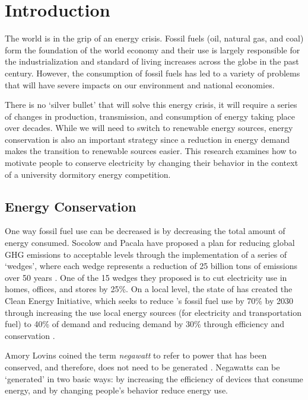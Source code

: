 \chapter{Introduction}

The world is in the grip of an energy crisis. Fossil fuels (oil, natural gas, and coal) form the foundation of the world economy and their use is largely responsible for the industrialization and standard of living increases across the globe in the past century. However, the consumption of fossil fuels has led to a variety of problems that will have severe impacts on our environment and national economies.

There is no `silver bullet' that will solve this energy crisis, it will require a series of changes in production, transmission, and consumption of energy taking place over decades. While we will need to switch to renewable energy sources, energy conservation is also an important strategy since a reduction in energy demand makes the transition to renewable sources easier. This research examines how to motivate people to conserve electricity by changing their behavior in the context of a university dormitory energy competition.

\section{Energy Conservation}

One way fossil fuel use can be decreased is by decreasing the total amount of energy consumed. Socolow and Pacala have proposed a plan for reducing global GHG emissions to acceptable levels through the implementation of a series of `wedges', where each wedge represents a reduction of 25 billion tons of \COtwo emissions over 50 years \cite{Socolow2008}. One of the 15 wedges they proposed is to cut electricity use in homes, offices, and stores by 25\%. On a local level, the state of \Hawaii has created the \Hawaii Clean Energy Initiative, which seeks to reduce \Hawaii's fossil fuel use by 70\% by 2030 through increasing the use local energy sources (for electricity and transportation fuel) to 40\% of demand and reducing demand by 30\% through efficiency and conservation \cite{HCEI-website}.

Amory Lovins coined the term \emph{negawatt} to refer to power that has been conserved, and therefore, does not need to be generated \cite{Kolbert2007Mr-Green}. Negawatts can be `generated' in two basic ways: by increasing the efficiency of devices that consume energy, and by changing people's behavior reduce energy use.

